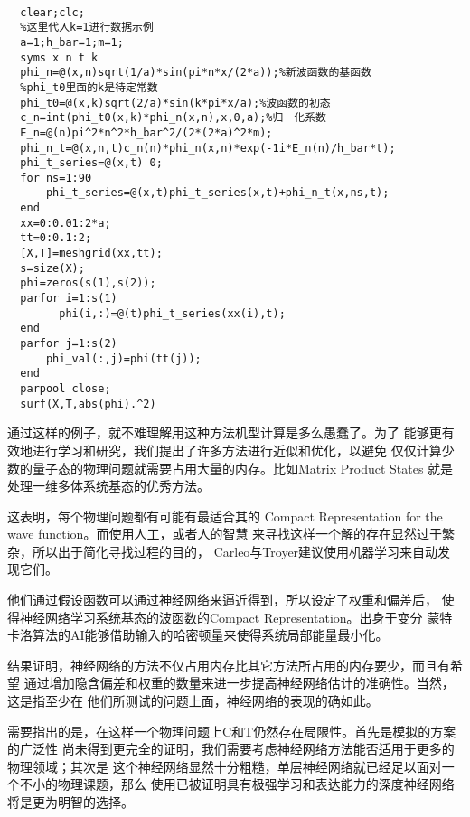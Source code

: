 \documentclass[UTF8,a4paper,10pt]{ctexart}
\begin{document}
~\\
\lstset{language=matlab}
\begin{lstlisting}
  clear;clc;
  %这里代入k=1进行数据示例
  a=1;h_bar=1;m=1;
  syms x n t k
  phi_n=@(x,n)sqrt(1/a)*sin(pi*n*x/(2*a));%新波函数的基函数
  %phi_t0里面的k是待定常数
  phi_t0=@(x,k)sqrt(2/a)*sin(k*pi*x/a);%波函数的初态
  c_n=int(phi_t0(x,k)*phi_n(x,n),x,0,a);%归一化系数
  E_n=@(n)pi^2*n^2*h_bar^2/(2*(2*a)^2*m);
  phi_n_t=@(x,n,t)c_n(n)*phi_n(x,n)*exp(-1i*E_n(n)/h_bar*t);
  phi_t_series=@(x,t) 0;
  for ns=1:90
      phi_t_series=@(x,t)phi_t_series(x,t)+phi_n_t(x,ns,t);
  end
  xx=0:0.01:2*a;
  tt=0:0.1:2;
  [X,T]=meshgrid(xx,tt);
  s=size(X);
  phi=zeros(s(1),s(2));
  parfor i=1:s(1)
        phi(i,:)=@(t)phi_t_series(xx(i),t);
  end
  parfor j=1:s(2)
      phi_val(:,j)=phi(tt(j));
  end
  parpool close;
  surf(X,T,abs(phi).^2)
\end{lstlisting}
 \newline

通过这样的例子，就不难理解用这种方法机型计算是多么愚蠢了。为了
能够更有效地进行学习和研究，我们提出了许多方法进行近似和优化，以避免
仅仅计算少数的量子态的物理问题就需要占用大量的内存。比如Matrix Product States
就是处理一维多体系统基态的优秀方法。\newline

这表明，每个物理问题都有可能有最适合其的
Compact Representation for the wave function。而使用人工，或者人的智慧
来寻找这样一个解的存在显然过于繁杂，所以出于简化寻找过程的目的，
Carleo与Troyer建议使用机器学习来自动发现它们。\newline

他们通过假设函数可以通过神经网络来逼近得到，所以设定了权重和偏差后，
使得神经网络学习系统基态的波函数的Compact Representation。出身于变分
蒙特卡洛算法的AI能够借助输入的哈密顿量来使得系统局部能量最小化。\newline

结果证明，神经网络的方法不仅占用内存比其它方法所占用的内存要少，而且有希望
通过增加隐含偏差和权重的数量来进一步提高神经网络估计的准确性。当然，这是指至少在
他们所测试的问题上面，神经网络的表现的确如此。\newline

需要指出的是，在这样一个物理问题上C和T仍然存在局限性。首先是模拟的方案的广泛性
尚未得到更完全的证明，我们需要考虑神经网络方法能否适用于更多的物理领域；其次是
这个神经网络显然十分粗糙，单层神经网络就已经足以面对一个不小的物理课题，那么
使用已被证明具有极强学习和表达能力的深度神经网络将是更为明智的选择。\newline
\end{document}
